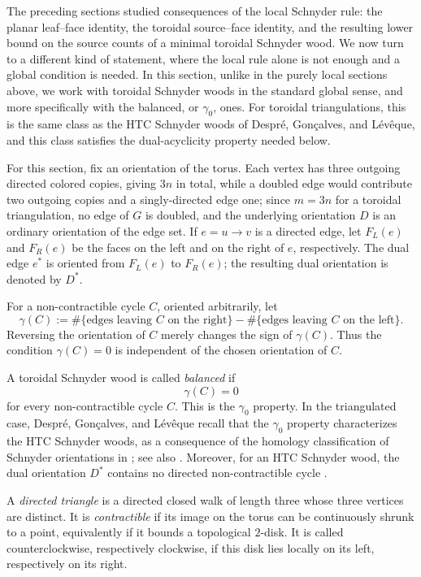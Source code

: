 \documentclass[11pt]{amsart}
\theoremstyle{plain}
\theoremstyle{definition}
\theoremstyle{remark}
\begin{document}
The preceding sections studied consequences of the local Schnyder rule: the planar leaf--face identity, the toroidal source--face identity, and the resulting lower bound on the source counts of a minimal toroidal Schnyder wood. We now turn to a different kind of statement, where the local rule alone is not enough and a global condition is needed. In this section, unlike in the purely local sections above, we work with toroidal Schnyder woods in the standard global sense, and more specifically with the balanced, or $\gamma_0$, ones. For toroidal triangulations, this is the same class as the HTC Schnyder woods of Despr\'e, Gon\c{c}alves, and L\'ev\^eque, and this class satisfies the dual-acyclicity property needed below.

For this section, fix an orientation of the torus. Each vertex has three outgoing directed colored copies, giving $3n$ in total, while a doubled edge would contribute two outgoing copies and a singly-directed edge one; since $m = 3n$ for a toroidal triangulation, no edge of $G$ is doubled, and the underlying orientation $D$ is an ordinary orientation of the edge set. If $e = u \to v$ is a directed edge, let $F_L(e)$ and $F_R(e)$ be the faces on the left and on the right of $e$, respectively. The dual edge $e^*$ is oriented from $F_L(e)$ to $F_R(e)$; the resulting dual orientation is denoted by $D^*$.

For a non-contractible cycle $C$, oriented arbitrarily, let
\[
  \gamma(C) :=
  \#\{\text{edges leaving $C$ on the right}\}
  - \#\{\text{edges leaving $C$ on the left}\}.
\]
Reversing the orientation of $C$ merely changes the sign of $\gamma(C)$. Thus the condition $\gamma(C) = 0$ is independent of the chosen orientation of $C$.

A toroidal Schnyder wood is called \emph{balanced} if
\[
  \gamma(C) = 0
\]
for every non-contractible cycle $C$. This is the $\gamma_0$ property. In the triangulated case, Despr\'e, Gon\c{c}alves, and L\'ev\^eque recall that the $\gamma_0$ property characterizes the HTC Schnyder woods, as a consequence of the homology classification of Schnyder orientations in \cite[Theorem~3.7 and Section~5.2]{goncalves-knauer-leveque2019}; see also \cite[Section~9]{despre-goncalves-leveque2017}. Moreover, for an HTC Schnyder wood, the dual orientation $D^*$ contains no directed non-contractible cycle \cite[Lemma~2]{despre-goncalves-leveque2017}.

A \emph{directed triangle} is a directed closed walk of length three whose three vertices are distinct. It is \emph{contractible} if its image on the torus can be continuously shrunk to a point, equivalently if it bounds a topological $2$-disk. It is called counterclockwise, respectively clockwise, if this disk lies locally on its left, respectively on its right.
\end{document}
